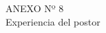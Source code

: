 \begin{center}
    \vspace*{\fill} %
    \Huge %
    ANEXO Nº 8 \\
    Experiencia del postor
    \vspace*{\fill} %
\end{center}